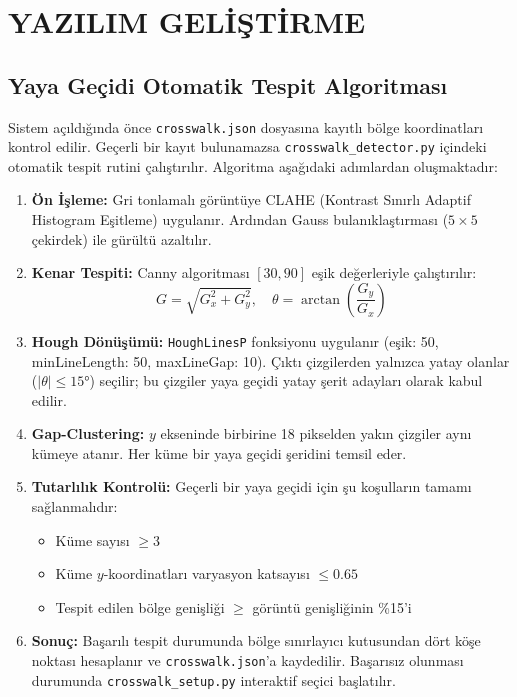 \section{YAZILIM GELİŞTİRME}

\subsection{Yaya Geçidi Otomatik Tespit Algoritması}

Sistem açıldığında önce \texttt{crosswalk.json} dosyasına kayıtlı bölge koordinatları kontrol edilir. Geçerli bir kayıt bulunamazsa \texttt{crosswalk\_detector.py} içindeki otomatik tespit rutini çalıştırılır. Algoritma aşağıdaki adımlardan oluşmaktadır:

\begin{enumerate}
  \item \textbf{Ön İşleme:} Gri tonlamalı görüntüye CLAHE (Kontrast Sınırlı Adaptif Histogram Eşitleme) uygulanır. Ardından Gauss bulanıklaştırması ($5\times5$ çekirdek) ile gürültü azaltılır.
  \item \textbf{Kenar Tespiti:} Canny algoritması $[30, 90]$ eşik değerleriyle çalıştırılır:
    \begin{equation}
      G = \sqrt{G_x^2 + G_y^2}, \quad \theta = \arctan\!\left(\frac{G_y}{G_x}\right)
    \end{equation}
  \item \textbf{Hough Dönüşümü:} \texttt{HoughLinesP} fonksiyonu uygulanır (eşik: 50, minLineLength: 50, maxLineGap: 10). Çıktı çizgilerden yalnızca yatay olanlar ($|\theta| \leq 15°$) seçilir; bu çizgiler yaya geçidi yatay şerit adayları olarak kabul edilir.
  \item \textbf{Gap-Clustering:} $y$ ekseninde birbirine 18 pikselden yakın çizgiler aynı kümeye atanır. Her küme bir yaya geçidi şeridini temsil eder.
  \item \textbf{Tutarlılık Kontrolü:} Geçerli bir yaya geçidi için şu koşulların tamamı sağlanmalıdır:
    \begin{itemize}
      \item Küme sayısı $\geq 3$
      \item Küme $y$-koordinatları varyasyon katsayısı $\leq 0.65$
      \item Tespit edilen bölge genişliği $\geq$ görüntü genişliğinin \%15'i
    \end{itemize}
  \item \textbf{Sonuç:} Başarılı tespit durumunda bölge sınırlayıcı kutusundan dört köşe noktası hesaplanır ve \texttt{crosswalk.json}'a kaydedilir. Başarısız olunması durumunda \texttt{crosswalk\_setup.py} interaktif seçici başlatılır.
\end{enumerate}

